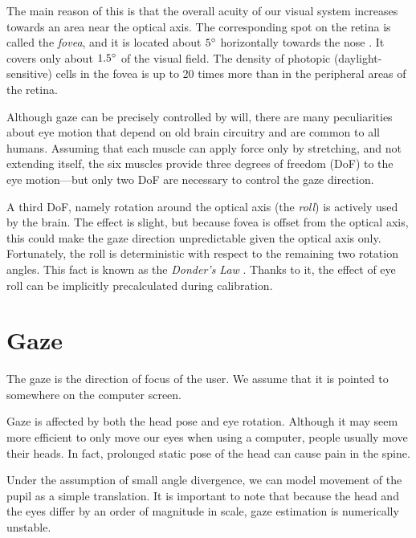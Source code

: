 The main reason of this is that the overall acuity of our visual system increases towards an area near the optical axis.
The corresponding spot on the retina is called the \textit{fovea}, and it is located about $5\degree$ horizontally towards the nose \cite{villanueva08}.
It covers only about $1.5\degree$ of the visual field.
The density of photopic (daylight-sensitive) cells in the fovea is up to 20 times more than in the peripheral areas of the retina.

Although gaze can be precisely controlled by will, there are many peculiarities about eye motion that depend on old brain circuitry and are common to all humans.
Assuming that each muscle can apply force only by stretching, and not extending itself, the six muscles provide three degrees of freedom (DoF) to the eye motion---but only two DoF are necessary to control the gaze direction.

A third DoF, namely rotation around the optical axis (the \textit{roll}) is actively used by the brain.
The effect is slight, but because fovea is offset from the optical axis, this could make the gaze direction unpredictable given the optical axis only.
Fortunately, the roll is deterministic with respect to the remaining two rotation angles.
This fact is known as the \textit{Donder's Law} \cite{hansen10}.
Thanks to it, the effect of eye roll can be implicitly precalculated during calibration.


\section{Gaze}
\label{s:gaze-model}

The gaze is the direction of focus of the user.
We assume that it is pointed to somewhere on the computer screen.

Gaze is affected by both the head pose and eye rotation.
Although it may seem more efficient to only move our eyes when using a computer, people usually move their heads.
In fact, prolonged static pose of the head can cause pain in the spine.


Under the assumption of small angle divergence, we can model movement of the pupil as a simple translation.
It is important to note that because the head and the eyes differ by an order of magnitude in scale, gaze estimation is numerically unstable.

